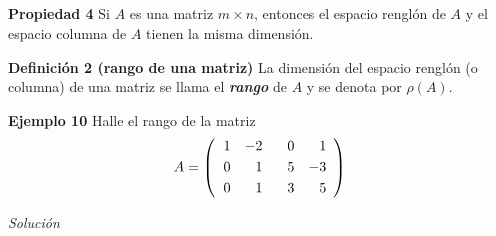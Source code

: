 \subsection{}

{\nologo
\begin{frame}%

\begin{prop}{\textbf{Propiedad 4}}
	\justifying
	Si $A$ es una matriz $m\times n$, entonces el espacio renglón de $A$ y el espacio columna de $A$
	tienen la misma dimensión.
\end{prop}	


\begin{defi}{\textbf{Definición 2 (rango de una matriz)}}
	La dimensión del espacio renglón (o columna) de una matriz se llama el \textbf{\textit{rango}}
	de $A$ y se denota por $\rho(A)$.
\end{defi}	


%

\begin{ej}{\textbf{Ejemplo 10}}
	Halle el rango de la matriz
	\[
	A = 
	\left( 
	\begin{array}{@{\hspace{\tabcolsep}}rrrr}	
	1 & -2 & \phantom{-}0 & 1 \\[1mm] 
	0 &  1 & 5 &  -3 \\[1mm] 
	0 &  1 & 3 & 5
	\end{array} 
	\right)
	\]
\end{ej}
\textit{Solución}

\end{frame}
}